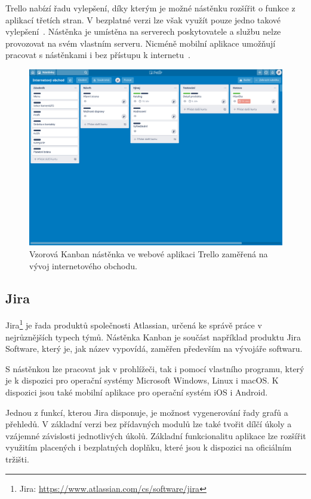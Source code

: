 Trello nabízí řadu vylepšení, díky kterým je možné nástěnku rozšířit o funkce z aplikací třetích stran. 
V bezplatné verzi lze však využít pouze jedno takové vylepšení~\cite{bib:trello-pricing}.
Nástěnka je umístěna na serverech poskytovatele a službu nelze provozovat na svém vlastním serveru. Nicméně mobilní aplikace umožňují pracovat s nástěnkami i bez přístupu k internetu~\cite{bib:trello-common}.

\begin{figure}[H]
	\centering
	\includegraphics[width=\textwidth]{obrazky-figures/trello.png}
	\caption{Vzorová Kanban nástěnka ve webové aplikaci Trello zaměřená na vývoj internetového obchodu.}
\end{figure}

\subsection{Jira}
Jira\footnote{Jira: \url{https://www.atlassian.com/cs/software/jira}} je řada produktů společnosti Atlassian, určená ke správě práce v nejrůznějších typech týmů. Nástěnka Kanban je součást například produktu Jira Software, který je, jak název vypovídá, zaměřen především na vývojáře softwaru. 

S nástěnkou lze pracovat jak v prohlížeči, tak i pomocí vlastního programu, který je k dispozici pro operační systémy Microsoft Windows, Linux i macOS. K dispozici jsou také mobilní aplikace pro operační systém iOS i Android. 

Jednou z funkcí, kterou Jira disponuje, je možnost vygenerování řady grafů a přehledů. V základní verzi bez přídavných modulů lze také tvořit dílčí úkoly a vzájemné závislosti jednotlivých úkolů. Základní funkcionalitu aplikace lze rozšířit využitím placených i bezplatných doplňku, které jsou k dispozici na oficiálním tržišti.

